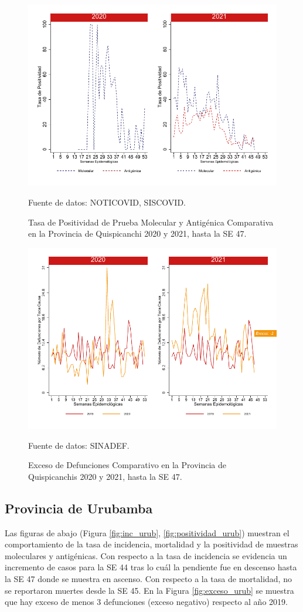 \documentclass[12pt,a4paper,openany]{book}
\begin{document}
		\begin{figure}[h]
			\caption{Tasa de Positividad de Prueba Molecular y Antigénica Comparativa en la Provincia de Quispicanchi 2020 y 2021, hasta la SE 47.}\label{fig:positividad_quisp}
			\begin{center}
				\includegraphics[width=0.7\linewidth]{../figuras/positividad_20_21_12}
			\end{center}
			{\footnotesize {Fuente de datos: NOTICOVID, SISCOVID.}}
		\end{figure}
		
		\begin{figure}[h]
			\caption{Exceso de Defunciones Comparativo en la Provincia de Quispicanchis 2020 y 2021, hasta la SE 47.}\label{fig:exceso_quisp}
			\begin{center}
				\includegraphics[width=0.7\linewidth]{../figuras/exceso_12}
			\end{center}
			{\footnotesize {Fuente de datos: SINADEF.}}
		\end{figure}
		
		\clearpage
		
		\subsection*{Provincia de Urubamba}
		\noindent Las figuras de abajo (Figura \ref{fig:inc_urub}, \ref{fig:positividad_urub}) muestran el comportamiento de la tasa de incidencia, mortalidad y la positividad de muestras moleculares y antigénicas. Con respecto a la tasa de incidencia se evidencia un incremento de casos para la SE 44 tras lo cuál la pendiente fue en descenso hasta la SE 47 donde se muestra en ascenso. 
		Con respecto a la tasa de mortalidad, no se reportaron muertes desde la SE 45.
		En la Figura \ref{fig:exceso_urub} se muestra que hay exceso de menos 3 defunciones (exceso negativo) respecto al año 2019.
		
\end{document}
